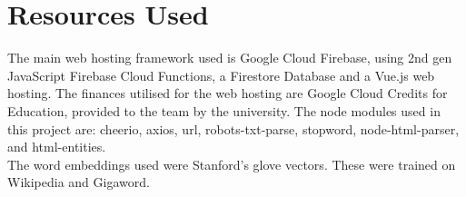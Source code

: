 \section{Resources Used}
The main web hosting framework used is Google Cloud Firebase, using 2nd gen JavaScript Firebase Cloud Functions, a Firestore Database and a Vue.js web hosting.
The finances utilised for the web hosting are Google Cloud Credits for Education, provided to the team by the university.
The node modules used in this project are: cheerio, axios, url, robots-txt-parse, stopword, node-html-parser, and html-entities.\\
The word embeddings used were Stanford's glove vectors. These were trained on Wikipedia and Gigaword.


